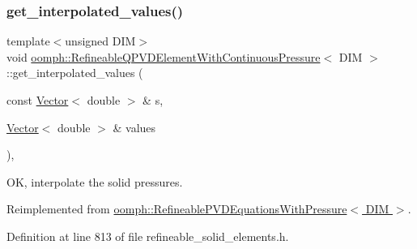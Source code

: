 \subsubsection{\texorpdfstring{get\+\_\+interpolated\+\_\+values()}{get\_interpolated\_values()}\hspace{0.1cm}{\footnotesize\ttfamily [1/2]}}
{\footnotesize\ttfamily template$<$unsigned D\+IM$>$ \\
void \hyperlink{classoomph_1_1RefineableQPVDElementWithContinuousPressure}{oomph\+::\+Refineable\+Q\+P\+V\+D\+Element\+With\+Continuous\+Pressure}$<$ D\+IM $>$\+::get\+\_\+interpolated\+\_\+values (\begin{DoxyParamCaption}\item[{const \hyperlink{classoomph_1_1Vector}{Vector}$<$ double $>$ \&}]{s,  }\item[{\hyperlink{classoomph_1_1Vector}{Vector}$<$ double $>$ \&}]{values }\end{DoxyParamCaption})\hspace{0.3cm}{\ttfamily [inline]}, {\ttfamily [virtual]}}



OK, interpolate the solid pressures. 



Reimplemented from \hyperlink{classoomph_1_1RefineablePVDEquationsWithPressure_a4e4bd0c67eaefb3f34a0744d17d07567}{oomph\+::\+Refineable\+P\+V\+D\+Equations\+With\+Pressure$<$ D\+I\+M $>$}.



Definition at line 813 of file refineable\+\_\+solid\+\_\+elements.\+h.

\mbox{\label{classoomph_1_1RefineableQPVDElementWithContinuousPressure_afed4014b4823a87360efcf723d52b5f5}} 

